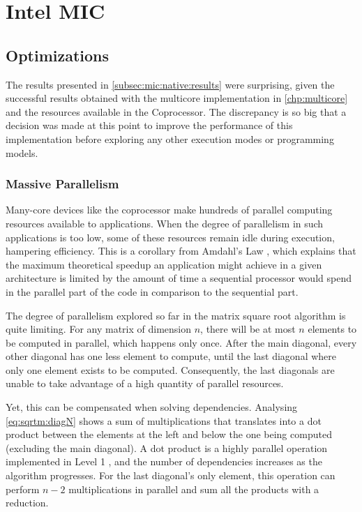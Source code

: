 \documentclass[../thesis]{subfiles}
\begin{document}
	\chapter{Intel MIC}
	\label{chp:mic}

	
	
	

	\section{Optimizations}
	\label{sec:mic:optims}
		The results presented in \cref{subsec:mic:native:results} were surprising, given the successful results obtained with the multicore implementation in \cref{chp:multicore} and the resources available in the \intel\xeonphi Coprocessor. The discrepancy is so big that a decision was made at this point to improve the performance of this implementation before exploring any other execution modes or programming models.

		\subsection{Massive Parallelism}
		Many-core devices like the \intel\xeonphi coprocessor make hundreds of parallel computing resources available to applications. When the degree of parallelism in such applications is too low, some of these resources remain idle during execution, hampering efficiency. This is a corollary from Amdahl's Law \cite{Amdahl:1967}, which explains that the maximum theoretical speedup an application might achieve in a given architecture is limited by the amount of time a sequential processor would spend in the parallel part of the code in comparison to the sequential part.

		The degree of parallelism explored so far in the matrix square root algorithm is quite limiting. For any matrix of dimension $n$, there will be at most $n$ elements to be computed in parallel, which happens only once. After the main diagonal, every other diagonal has one less element to compute, until the last diagonal where only one element exists to be computed. Consequently, the last diagonals are unable to take advantage of a high quantity of parallel resources.

		Yet, this can be compensated when solving dependencies. Analysing \cref{eq:sqrtm:diagN} shows a sum of multiplications that translates into a dot product between the elements at the left and below the one being computed (excluding the main diagonal). A dot product is a highly parallel operation implemented in Level 1 \blas, and the number of dependencies increases as the algorithm progresses. For the last diagonal's only element, this operation can perform $n-2$ multiplications in parallel and sum all the products with a reduction.
\end{document}
